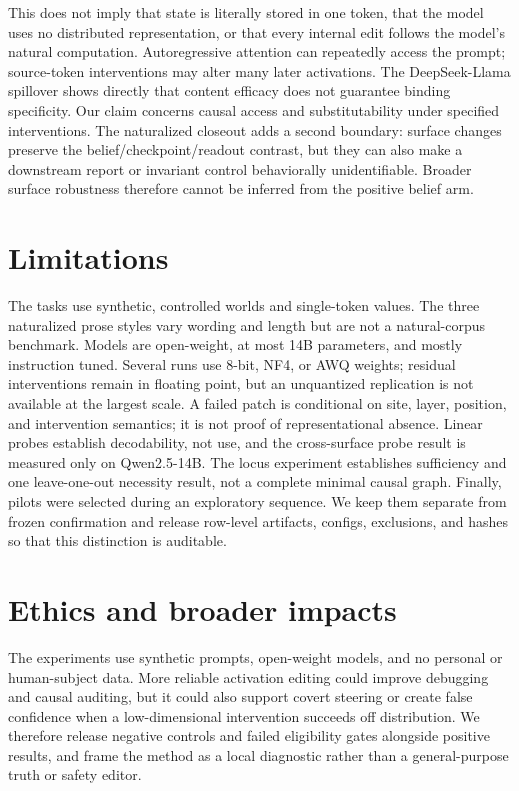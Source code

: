 \documentclass[10pt]{article}
\begin{document}
This does not imply that state is literally stored in one token, that the model
uses no distributed representation, or that every internal edit follows the
model's natural computation. Autoregressive attention can repeatedly access
the prompt; source-token interventions may alter many later activations. The
DeepSeek-Llama spillover shows directly that content efficacy does not
guarantee binding specificity. Our
claim concerns causal access and substitutability under specified
interventions. The naturalized closeout adds a second boundary: surface changes
preserve the belief/checkpoint/readout contrast, but they can also make a
downstream report or invariant control behaviorally unidentifiable. Broader
surface robustness therefore cannot be inferred from the positive belief arm.

\section{Limitations}

The tasks use synthetic, controlled worlds and single-token values. The three
naturalized prose styles vary wording and length but are not a natural-corpus
benchmark. Models are open-weight, at most 14B parameters, and mostly
instruction tuned. Several runs use 8-bit, NF4, or AWQ weights; residual
interventions remain in floating point, but an unquantized replication is not
available at the largest scale. A failed patch is conditional on site, layer,
position, and intervention semantics; it is not proof of representational
absence. Linear probes establish decodability, not use, and the cross-surface
probe result is measured only on Qwen2.5-14B. The locus experiment establishes
sufficiency and one leave-one-out necessity result, not a complete minimal
causal graph. Finally, pilots were selected during an exploratory sequence. We
keep them separate from frozen confirmation and release row-level artifacts,
configs, exclusions, and hashes so that this distinction is auditable.

\section{Ethics and broader impacts}

The experiments use synthetic prompts, open-weight models, and no personal or
human-subject data. More reliable activation editing could improve debugging
and causal auditing, but it could also support covert steering or create false
confidence when a low-dimensional intervention succeeds off distribution. We
therefore release negative controls and failed eligibility gates alongside
positive results, and frame the method as a local diagnostic rather than a
general-purpose truth or safety editor.
\end{document}
